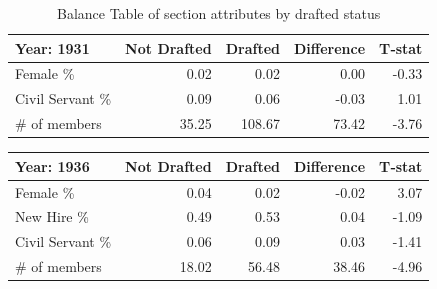 \begin{table}[ht]
\caption{Balance Table of section attributes by drafted status}
\centering
\begin{tabular}{lrrrr}
  \hline
 Year: 1931 & Not Drafted & Drafted & Difference & T‑stat \\ 
  \hline
  Female \%        & 0.02 & 0.02 & 0.00 & -0.33 \\ 
  Civil Servant \% & 0.09 & 0.06 & -0.03 & 1.01 \\ 
  \# of members         & 35.25 & 108.67 & 73.42 & -3.76 \\ 
  \hline 
\end{tabular}
\end{table}

\begin{table}[ht]
\centering
\begin{tabular}{lrrrr}
  \hline
 Year: 1936 & Not Drafted & Drafted & Difference & T‑stat \\ 
  \hline
  Female \%        & 0.04 & 0.02 & -0.02 & 3.07 \\ 
  New Hire \%      & 0.49 & 0.53 & 0.04 & -1.09 \\ 
  Civil Servant \% & 0.06 & 0.09 & 0.03 & -1.41 \\ 
  \# of members    & 18.02 & 56.48 & 38.46 & -4.96 \\ 
  \hline 
\end{tabular}
\end{table}
